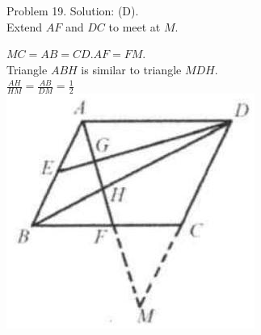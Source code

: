 \documentclass[10pt]{article}
\begin{document}
Problem 19. Solution: (D).\\
Extend \(A F\) and \(D C\) to meet at \(M\).


\(M C=A B=C D . A F=F M\).\\
Triangle \(A B H\) is similar to triangle \(M D H\).\\
\(\frac{A H}{H M}=\frac{A B}{D M}=\frac{1}{2}\)\\
\includegraphics[max width=\textwidth, center]{2025_04_17_97bc1f7e44d93c271a88g-141(3)}
\end{document}
